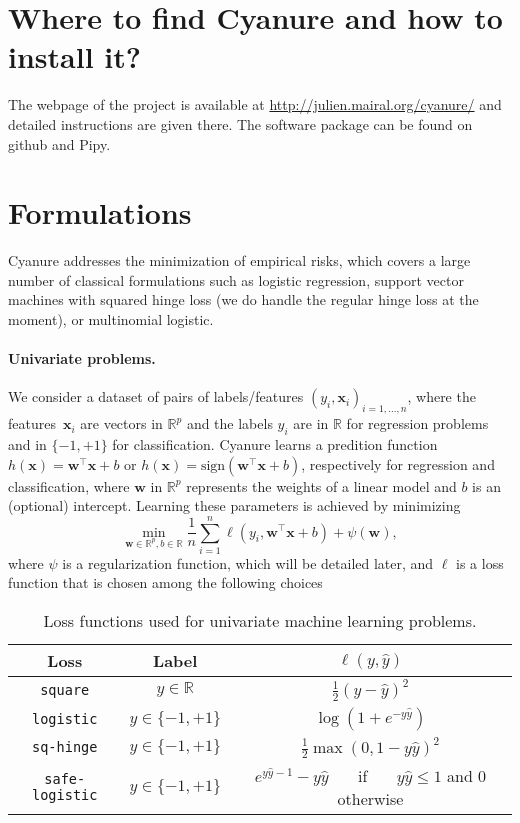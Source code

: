 \documentclass{article}
\def\x{{\mathbf{x}}}
\def\w{{\mathbf{w}}}
\def\haty{{\hat{y}}}
\def\wb{{\mathbf{w}}}
\def\Real{{\mathbb{R}}}
\begin{document}
\section{Where to find Cyanure and how to install it?}
The webpage of the project is available at \url{http://julien.mairal.org/cyanure/} and detailed instructions are given there. The software package can be found on github and Pipy.

\section{Formulations}\label{sec:formulations}
Cyanure addresses the minimization of empirical risks, which covers a large
number of classical formulations such as logistic regression, support vector
machines with squared hinge loss (we do handle the regular hinge loss at the
moment), or multinomial logistic.


\paragraph{Univariate problems.} We consider a dataset of pairs of
labels/features $(y_i,\x_i)_{i=1,\ldots,n}$, where the features~$\x_i$ are
vectors in $\Real^p$ and the labels $y_i$ are in $\Real$ for regression
problems and in $\{-1,+1\}$ for classification.
Cyanure learns a predition function $h(\x)= \w^\top \x + b$ or $h(\x)=\text{sign}(\w^\top \x + b)$, respectively for regression and classification, 
where $\w$ in
$\Real^p$ represents the weights of a linear model and $b$ is an (optional)
intercept. Learning these parameters is achieved by minimizing
\begin{displaymath}
   \min_{\w \in \Real^p, b \in \Real} \frac{1}{n}\sum_{i=1}^n \ell(y_i, \wb^\top \x + b)  + \psi(\w), 
\end{displaymath}
where $\psi$ is a regularization function, which will be detailed later, and $\ell$ is a loss function that is chosen among the following choices
\begin{table}[h!]
   \centering
   \begin{tabular}{|c|c|c|}
      \hline
      Loss  & Label  &  $\ell(y, \hat{y})$ \\  
      \hline
      \texttt{square} &  $y \in \Real$ &  $\frac{1}{2}( y-\haty)^2$ \\ 
      \hline
      \texttt{logistic} &  $y \in \{-1,+1\}$ &  $ \log(1+e^{-y \hat{y}})$ \\ 
      \hline
      \texttt{sq-hinge} &  $y \in \{-1,+1\}$ &  $ \frac{1}{2}\max(0,1-y \hat{y})^2$ \\ 
      \hline
      \texttt{safe-logistic} &  $y \in \{-1,+1\}$ &  $e^{y \haty -1}- y \haty $~~~ if~~~ $ y \haty \leq 1$ and $0$ otherwise \\ 
      \hline
   \end{tabular}
   \caption{Loss functions used for univariate machine learning problems.} \label{table:loss}
\end{table}
\end{document}

